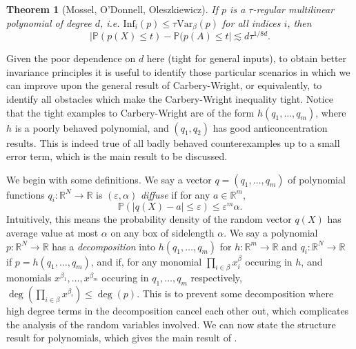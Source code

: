 \documentclass[12pt]{article}
\newtheorem{theorem}{Theorem}
\begin{document}
\begin{theorem}[Mossel, O'Donnell, Oleszkiewicz]
    If $p$ is a \emph{$\tau$-regular} multilinear polynomial of degree $d$, i.e. $\text{Inf}_i(p) \leq \tau \text{Var}_\beta(p)$ for all indices $i$, then
    \[ |\mathbb{P}(p(X) \leq t) - \mathbb{P}(p(A) \leq t| \lesssim d \tau^{1/8d}. \]
\end{theorem}

Given the poor dependence on $d$ here (tight for general inputs), to obtain better invariance principles it is useful to identify those particular scenarios in which we can improve upon the general result of Carbery-Wright, or equivalently, to identify all obstacles which make the Carbery-Wright inequality tight. Notice that the tight examples to Carbery-Wright are of the form $h(q_1,\dots,q_m)$, where $h$ is a poorly behaved polynomial, and $(q_1,q_2)$ has good anticoncentration results. This is indeed true of all badly behaved counterexamples up to a small error term, which is the main result to be discussed.

We begin with some definitions. We say a vector $q = (q_1,\dots,q_m)$ of polynomial functions $q_i: \mathbb{R}^N \to \mathbb{R}$ is $(\varepsilon,\alpha)$ \emph{diffuse} if for any $a \in \mathbb{R}^m$,
%
\[ \mathbb{P}(|q(X) - a| \leq \varepsilon) \leq \varepsilon^m \alpha. \]
%
Intuitively, this means the probability density of the random vector $q(X)$ has average value at most $\alpha$ on any box of sidelength $\alpha$. We say a polynomial $p: \mathbb{R}^N \to \mathbb{R}$ has a \emph{decomposition} into $h(q_1,\dots,q_m)$ for $h: \mathbb{R}^m \to \mathbb{R}$ and $q_i: \mathbb{R}^N \to \mathbb{R}$ if $p = h(q_1,\dots,q_m)$, and if, for any monomial $\prod_{i \in \beta} x_i^\beta$ occuring in $h$, and monomials $x^{\beta_1}, \dots, x^{\beta_m}$ occuring in $q_1,\dots,q_m$ respectively, $\deg(\prod_{i \in \beta} x^{\beta_i}) \leq \deg(p)$. This is to prevent some decomposition where high degree terms in the decomposition cancel each other out, which complicates the analysis of the random variables involved. We can now state the structure result for polynomials, which gives the main result of \cite{Kane}.
\end{document}

